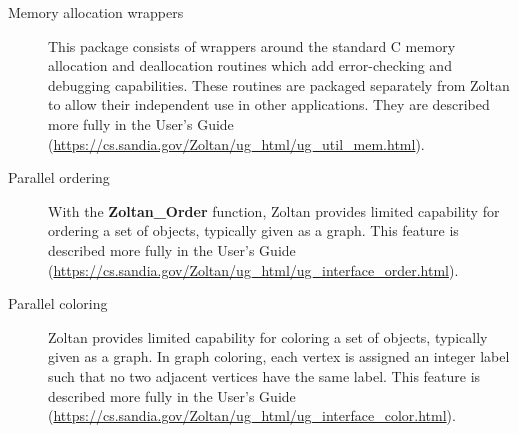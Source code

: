 \begin{description}
\item [Memory allocation wrappers]
This package consists of wrappers around the standard C memory allocation and 
deallocation routines which add error-checking and debugging capabilities. These 
routines are packaged separately from Zoltan to allow their independent use in other 
applications. 
They are described more fully in the User's Guide
(\url{https://cs.sandia.gov/Zoltan/ug\_html/ug\_util\_mem.html}).

\item [Parallel ordering]
With the \textbf{Zoltan\_Order} function,
Zoltan provides limited capability for ordering a set of objects, typically 
given as a graph.
This feature is described more fully in the User's Guide
(\url{https://cs.sandia.gov/Zoltan/ug\_html/ug\_interface\_order.html}).

\item [Parallel coloring]
Zoltan provides limited capability for coloring a set of objects, typically given 
as a graph. In graph coloring, each vertex is assigned an integer label such 
that no two adjacent vertices have the same label. 
This feature is described more fully in the User's Guide
(\url{https://cs.sandia.gov/Zoltan/ug\_html/ug\_interface\_color.html}).
\end{description}
